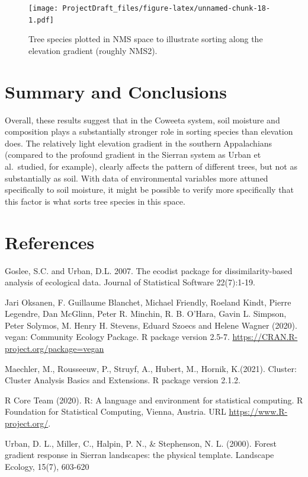 \documentclass[
  12pt,
]{article}
\begin{document}
\begin{figure}
\centering
\texttt{[image: ProjectDraft\_files/figure-latex/unnamed-chunk-18-1.pdf]}
\caption{Tree species plotted in NMS space to illustrate sorting along
the elevation gradient (roughly NMS2).}
\end{figure}

\newpage

\hypertarget{summary-and-conclusions}{%
\section{Summary and Conclusions}\label{summary-and-conclusions}}

Overall, these results suggest that in the Coweeta system, soil moisture
and composition plays a substantially stronger role in sorting species
than elevation does. The relatively light elevation gradient in the
southern Appalachians (compared to the profound gradient in the Sierran
system as Urban et al.~studied, for example), clearly affects the
pattern of different trees, but not as substantially as soil. With data
of environmental variables more attuned specifically to soil moisture,
it might be possible to verify more specifically that this factor is
what sorts tree species in this space.

\newpage

\hypertarget{references}{%
\section{References}\label{references}}

Goslee, S.C. and Urban, D.L. 2007. The ecodist package for
dissimilarity-based analysis of ecological data. Journal of Statistical
Software 22(7):1-19.

Jari Oksanen, F. Guillaume Blanchet, Michael Friendly, Roeland Kindt,
Pierre Legendre, Dan McGlinn, Peter R. Minchin, R. B. O'Hara, Gavin L.
Simpson, Peter Solymos, M. Henry H. Stevens, Eduard Szoecs and Helene
Wagner (2020). vegan: Community Ecology Package. R package version
2.5-7. \url{https://CRAN.R-project.org/package=vegan}

Maechler, M., Rousseeuw, P., Struyf, A., Hubert, M., Hornik, K.(2021).
Cluster: Cluster Analysis Basics and Extensions. R package version
2.1.2.

R Core Team (2020). R: A language and environment for statistical
computing. R Foundation for Statistical Computing, Vienna, Austria. URL
\url{https://www.R-project.org/}.

Urban, D. L., Miller, C., Halpin, P. N., \& Stephenson, N. L. (2000).
Forest gradient response in Sierran landscapes: the physical template.
Landscape Ecology, 15(7), 603-620
\end{document}

